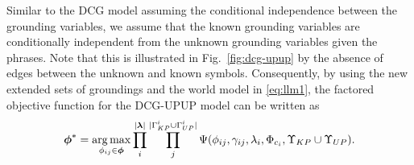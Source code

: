 Similar to the DCG model assuming the conditional independence between the grounding variables, we assume that the known grounding variables are conditionally independent from the unknown grounding variables given the phrases. Note that this is illustrated in Fig.~\ref{fig:dcg-upup} by the absence of edges between the unknown and known symbols. Consequently, by using the new extended sets of groundings and the world model in \eqref{eq:llm1}, the factored  objective function for the DCG-UPUP model can be written as
\begin{equation}
\boldsymbol{\phi}^* = \operatorname*{\arg\max}_{\phi_{ij} \in \boldsymbol{\phi}} \prod_{i}^{|\boldsymbol\lambda|} \prod_{j}^{|\Gamma^i_{KP} \cup \Gamma^i_{UP}|} \Psi(\phi_{ij},\gamma_{ij},\lambda_i, \Phi_{c_{i}},\Upsilon_{KP} \cup \Upsilon_{UP}).
\label{eq:dcg_upup_llm1}
\end{equation}

